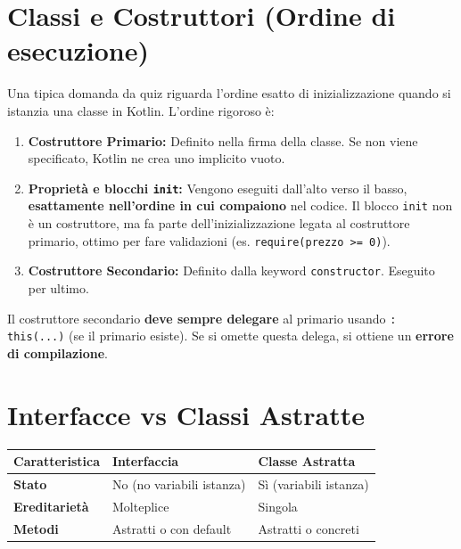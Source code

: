 \section{Classi e Costruttori (Ordine di esecuzione)}
Una tipica domanda da quiz riguarda l'ordine esatto di inizializzazione quando si istanzia una classe in Kotlin.
L'ordine rigoroso è:
\begin{enumerate}
    \item \textbf{Costruttore Primario:} Definito nella firma della classe.
    Se non viene specificato, Kotlin ne crea uno implicito vuoto.
    \item \textbf{Proprietà e blocchi \texttt{init}:} Vengono eseguiti dall'alto verso il basso, \textbf{esattamente nell'ordine in cui compaiono} nel codice.
    Il blocco \texttt{init} non è un costruttore, ma fa parte dell'inizializzazione legata al costruttore primario, ottimo per fare validazioni (es. \texttt{require(prezzo >= 0)}).
    \item \textbf{Costruttore Secondario:} Definito dalla keyword \texttt{constructor}.
    Eseguito per ultimo.
\end{enumerate}

\begin{tcolorbox}[colback=red!5!white,colframe=red!75!black,title=Regola d'oro Costruttori (Domanda Quiz)]
    Il costruttore secondario \textbf{deve sempre delegare} al primario usando \texttt{: this(...)} (se il primario esiste).
    Se si omette questa delega, si ottiene un \textbf{errore di compilazione}.
\end{tcolorbox}

\section{Interfacce vs Classi Astratte}
\begin{table}[h]
    \centering
    \begin{tabularx}{\textwidth}{|l|X|X|}
\hline
\rowcolor{gray!20} \textbf{Caratteristica} & \textbf{Interfaccia} & \textbf{Classe Astratta} \\ \hline
\textbf{Stato} & No (no variabili istanza) & Sì (variabili istanza) \\ \hline
\textbf{Ereditarietà} & Molteplice & Singola \\ \hline
\textbf{Metodi} & Astratti o con default & Astratti o concreti \\ \hline
    \end{tabularx}
\end{table}

